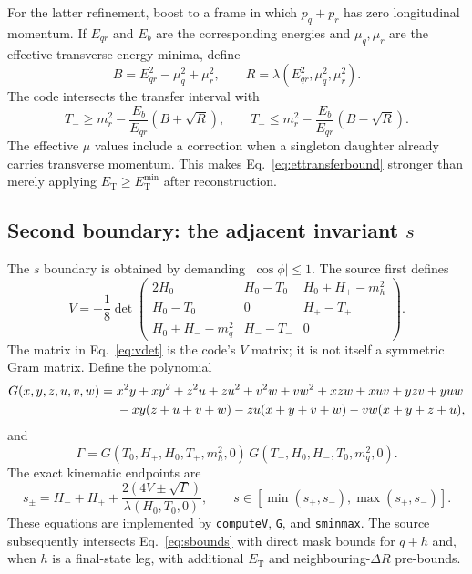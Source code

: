 \documentclass[11pt,a4paper]{article}
\newcommand{\code}[1]{\texttt{#1}}
\newcommand{\lam}{\lambda}
\newcommand{\ET}{E_{\mathrm{T}}}
\begin{document}
For the latter refinement, boost to a frame in which $p_q+p_r$ has zero
longitudinal momentum.  If $E_{qr}$ and $E_b$ are the corresponding energies
and $\mu_q,\mu_r$ are the effective transverse-energy minima, define
\begin{equation}
 B=E_{qr}^2-\mu_q^2+\mu_r^2,
 \qquad R=\lam(E_{qr}^2,\mu_q^2,\mu_r^2).
 \label{eq:etbounddefinitions}
\end{equation}
The code intersects the transfer interval with
\begin{equation}
 T_-\geq m_r^2-\frac{E_b}{E_{qr}}(B+\sqrt R),\qquad
 T_-\leq m_r^2-\frac{E_b}{E_{qr}}(B-\sqrt R).
 \label{eq:ettransferbound}
\end{equation}
The effective $\mu$ values include a correction when a singleton daughter
already carries transverse momentum.  This makes Eq.~\eqref{eq:ettransferbound}
stronger than merely applying $\ET\geq\ET^{\min}$ after reconstruction.

\subsection{Second boundary: the adjacent invariant $s$}

The $s$ boundary is obtained by demanding $|\cos\phi|\leq1$.  The source
first defines
\begin{equation}
 V=-\frac{1}{8}\det\begin{pmatrix}
 2H_0&H_0-T_0&H_0+H_+-m_h^2\\
 H_0-T_0&0&H_+-T_+\\
 H_0+H_--m_q^2&H_--T_-&0
 \end{pmatrix}.
 \label{eq:vdet}
\end{equation}
The matrix in Eq.~\eqref{eq:vdet} is the code's $V$ matrix; it is not itself a
symmetric Gram matrix.  Define the polynomial
\begin{align}
 G(x,y,z,u,v,w)={}&x^2y+xy^2+z^2u+zu^2+v^2w+vw^2
 +xzw+xuv+yzv+yuw\notag\\
 &{}-xy(z+u+v+w)-zu(x+y+v+w)-vw(x+y+z+u),
 \label{eq:gpoly}
\end{align}
and
\begin{equation}
 \Gamma=G(T_0,H_+,H_0,T_+,m_h^2,0)\,
          G(T_-,H_0,H_-,T_0,m_q^2,0).
 \label{eq:gamma}
\end{equation}
The exact kinematic endpoints are
\begin{equation}
 s_\pm=H_-+H_++
 \frac{2\left(4V\pm\sqrt\Gamma\right)}{\lam(H_0,T_0,0)},
 \qquad s\in[\min(s_+,s_-),\max(s_+,s_-)].
 \label{eq:sbounds}
\end{equation}
These equations are implemented by \code{computeV}, \code{G}, and
\code{sminmax}.  The source subsequently intersects Eq.~\eqref{eq:sbounds}
with direct mask bounds for $q+h$ and, when $h$ is a final-state leg, with
additional $\ET$ and neighbouring-$\Delta R$ pre-bounds.
\end{document}
